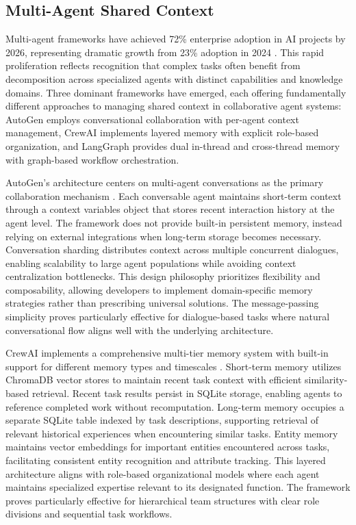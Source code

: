 \documentclass[11pt,letterpaper]{article}
\begin{document}
\subsection{Multi-Agent Shared Context}

Multi-agent frameworks have achieved 72\% enterprise adoption in AI projects by 2026, representing dramatic growth from 23\% adoption in 2024 \cite{amplework2024comparison}. This rapid proliferation reflects recognition that complex tasks often benefit from decomposition across specialized agents with distinct capabilities and knowledge domains. Three dominant frameworks have emerged, each offering fundamentally different approaches to managing shared context in collaborative agent systems: AutoGen employs conversational collaboration with per-agent context management, CrewAI implements layered memory with explicit role-based organization, and LangGraph provides dual in-thread and cross-thread memory with graph-based workflow orchestration.

AutoGen's architecture centers on multi-agent conversations as the primary collaboration mechanism \cite{wu2023autogen}. Each conversable agent maintains short-term context through a context variables object that stores recent interaction history at the agent level. The framework does not provide built-in persistent memory, instead relying on external integrations when long-term storage becomes necessary. Conversation sharding distributes context across multiple concurrent dialogues, enabling scalability to large agent populations while avoiding context centralization bottlenecks. This design philosophy prioritizes flexibility and composability, allowing developers to implement domain-specific memory strategies rather than prescribing universal solutions. The message-passing simplicity proves particularly effective for dialogue-based tasks where natural conversational flow aligns well with the underlying architecture.

CrewAI implements a comprehensive multi-tier memory system with built-in support for different memory types and timescales \cite{datacamp2024comparison}. Short-term memory utilizes ChromaDB vector stores to maintain recent task context with efficient similarity-based retrieval. Recent task results persist in SQLite storage, enabling agents to reference completed work without recomputation. Long-term memory occupies a separate SQLite table indexed by task descriptions, supporting retrieval of relevant historical experiences when encountering similar tasks. Entity memory maintains vector embeddings for important entities encountered across tasks, facilitating consistent entity recognition and attribute tracking. This layered architecture aligns with role-based organizational models where each agent maintains specialized expertise relevant to its designated function. The framework proves particularly effective for hierarchical team structures with clear role divisions and sequential task workflows.
\end{document}
